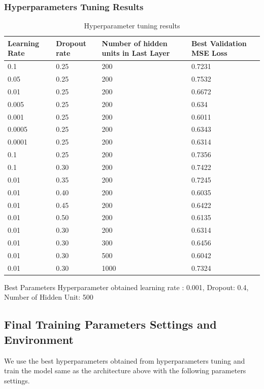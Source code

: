 \documentclass{article}
\begin{document}
\subsubsection{Hyperparameters Tuning Results}


\begin{table}[htb]
	\caption{Hyperparameter tuning results}
	\label{sample-table}
	\centering
	\begin{tabular}{llll}
		\toprule
		\cmidrule{1-4}
		Learning Rate & Dropout rate & Number of hidden units in Last Layer & Best Validation MSE Loss\\
		\midrule
		0.1 & 0.25  & 200 & 0.7231  \\
		0.05 & 0.25  & 200 & 0.7532 \\
		0.01 & 0.25  & 200 & 0.6672\\
		0.005 & 0.25  & 200 & 0.634 \\
		0.001 & 0.25  & 200 & 0.6011\\
		0.0005 & 0.25  & 200 & 0.6343 \\
		0.0001 & 0.25  & 200 & 0.6314 \\
		0.1 & 0.25  & 200 & 0.7356\\
		0.1 & 0.30  & 200 & 0.7422 \\
		0.01 & 0.35  & 200 & 0.7245 \\
		0.01 & 0.40  & 200 & 0.6035 \\
		0.01 & 0.45  & 200 & 0.6422 \\
		0.01 & 0.50  & 200 & 0.6135 \\
		0.01 & 0.30  & 200 & 0.6314\\
		0.01 & 0.30  & 300 & 0.6456\\
		0.01 & 0.30  & 500 & 0.6042\\
		0.01 & 0.30  & 1000 & 0.7324\\
		\bottomrule
	\end{tabular}
\end{table}

Best Parameters Hyperparameter obtained { learning rate : 0.001, Dropout: 0.4, Number of Hidden Unit: 500}

 
\subsection{Final Training Parameters Settings and Environment}

We use the best hyperparameters obtained from hyperparameters tuning and train the model same as the architecture above with the following parameters settings.
\end{document}
